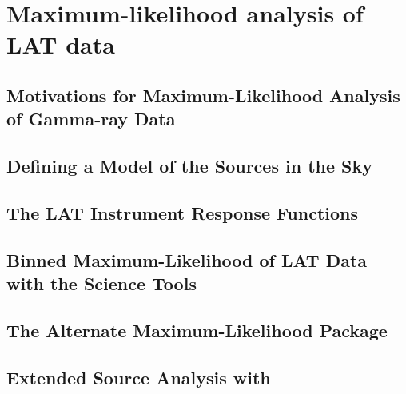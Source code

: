\chapter{Maximum-likelihood analysis of LAT data}



\section{Motivations for Maximum-Likelihood Analysis of Gamma-ray Data}


\section{Defining a Model of the Sources in the Sky}


\section{The LAT Instrument Response Functions}


\section{Binned Maximum-Likelihood of LAT Data with the Science Tools}



\section{The Alternate Maximum-Likelihood Package \pointlike}


\section{Extended Source Analysis with \pointlike}
